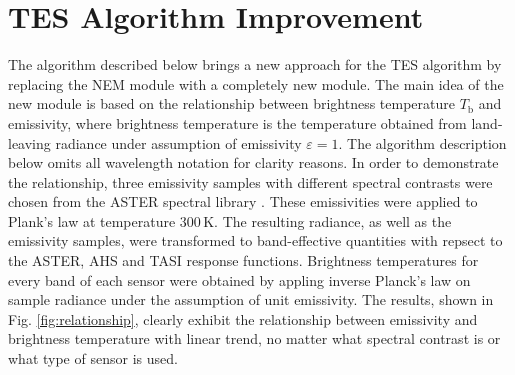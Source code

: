 \section{TES Algorithm Improvement}

The algorithm described below brings a new approach for the TES algorithm by replacing the NEM module with a completely new module. The main idea of the new module is based on the relationship  between brightness temperature $T_\mathrm{b}$ and emissivity, where brightness temperature is the temperature obtained from land-leaving radiance under assumption of emissivity $\varepsilon=1$. The algorithm description below omits all wavelength notation for clarity reasons. In order to demonstrate the relationship, three emissivity samples with different spectral contrasts were chosen from the ASTER spectral library \cite{baldridge_aster_2009}. These emissivities were applied to Plank's law at temperature $300\,\mathrm{K}$. The resulting radiance, as well as the emissivity samples, were transformed to band-effective quantities with repsect to the ASTER, AHS and TASI response functions. Brightness temperatures for every band of each sensor were obtained by appling inverse Planck's law on sample radiance under the assumption of unit emissivity. The results, shown in Fig. \ref{fig:relationship}, clearly exhibit the relationship between emissivity and brightness temperature with linear trend, no matter what spectral contrast is or what type of sensor is used.

